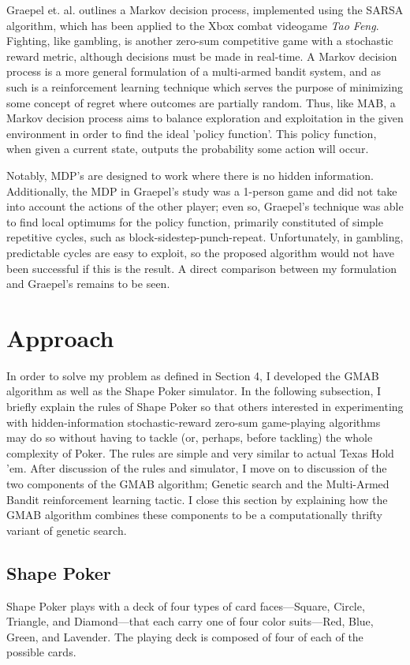 \documentclass[11pt]{article}
\begin{document}
Graepel et. al. \cite{Grae-Herb-2004} outlines a Markov decision process, implemented using the SARSA algorithm, which has been applied to the Xbox combat videogame \textit{Tao Feng}. Fighting, like gambling, is another zero-sum competitive game with a stochastic reward metric, although decisions must be made in real-time. A Markov decision process is a more general formulation of a multi-armed bandit system, and as such is a reinforcement learning technique which serves the purpose of minimizing some concept of regret where outcomes are partially random. Thus, like MAB, a Markov decision process aims to balance exploration and exploitation in the given environment in order to find the ideal 'policy function'. This policy function, when given a current state, outputs the probability some action will occur.

Notably, MDP's are designed to work where there is no hidden information. Additionally, the MDP in Graepel's study was a 1-person game and did not take into account the actions of the other player; even so, Graepel's technique was able to find local optimums for the policy function, primarily constituted of simple repetitive cycles, such as block-sidestep-punch-repeat. Unfortunately, in gambling, predictable cycles are easy to exploit, so the proposed algorithm would not have been successful if this is the result. A direct comparison between my formulation and Graepel's remains to be seen.

\section{Approach}

In order to solve my problem as defined in Section 4, I developed the GMAB algorithm as well as the Shape Poker simulator. In the following subsection, I briefly explain the rules of Shape Poker so that others interested in experimenting with hidden-information stochastic-reward zero-sum game-playing algorithms may do so without having to tackle (or, perhaps, before tackling) the whole complexity of Poker. The rules are simple and very similar to actual Texas Hold 'em. After discussion of the rules and simulator, I move on to discussion of the two components of the GMAB algorithm; Genetic search and the Multi-Armed Bandit reinforcement learning tactic. I close this section by explaining how the GMAB algorithm combines these components to be a computationally thrifty variant of genetic search.

\subsection{Shape Poker}
Shape Poker plays with a deck of four types of card faces---Square, Circle, Triangle, and Diamond---that each carry one of four color suits---Red, Blue, Green, and Lavender. The playing deck is composed of four of each of the possible cards. 
\end{document}

